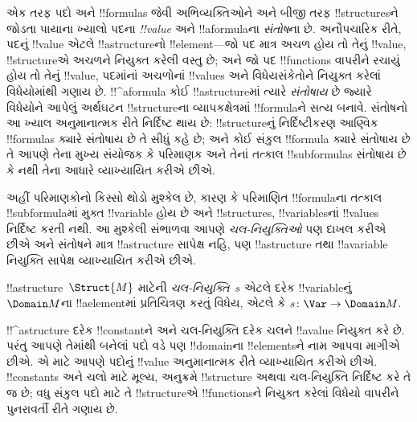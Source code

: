 \documentclass[../../../include/open-logic-section]{subfiles}
\begin{document}


\begin{explain}
એક તરફ પદો અને !!{formula}s જેવી અભિવ્યક્તિઓને અને બીજી તરફ
!!{structure}sને જોડતા પાયાના ખ્યાલો પદના \emph{!!{value}} અને
!!a{formula}ના \emph{સંતોષ}ના છે. અનૌપચારિક રીતે, પદનું !!{value}
એટલે !!a{structure}નો !!{element}---જો પદ માત્ર અચળ હોય તો તેનું
!!{value}, !!{structure}એ અચળને નિયુક્ત કરેલી વસ્તુ છે; અને જો પદ
!!{function}s વાપરીને રચાયું હોય તો તેનું !!{value}, પદમાંનાં અચળોનાં
!!{value}s અને વિધેયસંકેતોને નિયુક્ત કરેલાં વિધેયોમાંથી ગણાય છે.
!!^a{formula} કોઈ !!a{structure}માં ત્યારે \emph{સંતોષાય} છે જ્યારે
વિધેયોને આપેલું અર્થઘટન !!{structure}ના વ્યાપકક્ષેત્રમાં !!{formula}ને સત્ય
બનાવે. સંતોષનો આ ખ્યાલ અનુમાનાત્મક રીતે નિર્દિષ્ટ થાય છે:
!!{structure}નું નિર્દિષ્ટીકરણ આણ્વિક !!{formula}s ક્યારે સંતોષાય છે તે
સીધું કહે છે; અને કોઈ સંકુલ !!{formula} ક્યારે સંતોષાય છે તે આપણે તેના
મુખ્ય સંયોજક કે પરિમાણક અને તેનાં તત્કાલ !!{subformula}s સંતોષાય છે કે
નથી તેના આધારે વ્યાખ્યાયિત કરીએ છીએ.

અહીં પરિમાણકોનો કિસ્સો થોડો મુશ્કેલ છે, કારણ કે પરિમાણિત
!!{formula}ના તત્કાલ !!{subformula}માં મુક્ત !!{variable} હોય છે અને
!!{structure}s, !!{variable}sનાં !!{value}s નિર્દિષ્ટ કરતી નથી. આ
મુશ્કેલી સંભાળવા આપણે \emph{ચલ-નિયુક્તિઓ} પણ દાખલ કરીએ છીએ અને સંતોષને
માત્ર !!a{structure} સાપેક્ષ નહિ, પણ !!a{structure} તથા
!!a{variable} નિયુક્તિ સાપેક્ષ વ્યાખ્યાયિત કરીએ છીએ.
\end{explain}

\begin{defn}[ચલ-નિયુક્તિ]
!!a{structure}~$\Struct{M}$ માટેની \emph{ચલ-નિયુક્તિ}~$s$ એટલે દરેક
!!{variable}નું~$\Domain M$ના !!a{element}માં પ્રતિચિત્રણ કરતું વિધેય,
એટલે કે $s\colon \Var \to \Domain M$.
\end{defn}

\begin{explain}
!!^a{structure} દરેક !!{constant}ને અને ચલ-નિયુક્તિ દરેક ચલને
!!a{value} નિયુક્ત કરે છે. પરંતુ આપણે તેમાંથી બનેલાં પદો વડે પણ
!!{domain}ના !!{element}sને નામ આપવા માગીએ છીએ. એ માટે આપણે પદોનું
!!{value} અનુમાનાત્મક રીતે વ્યાખ્યાયિત કરીએ છીએ. !!{constant}s અને
ચલો માટે મૂલ્ય, અનુક્રમે !!{structure} અથવા ચલ-નિયુક્તિ નિર્દિષ્ટ કરે
તે જ છે; વધુ સંકુલ પદો માટે તે !!{structure}એ !!{function}sને નિયુક્ત
કરેલાં વિધેયો વાપરીને પુનરાવર્તી રીતે ગણાય છે.
\end{explain}
\end{document}
